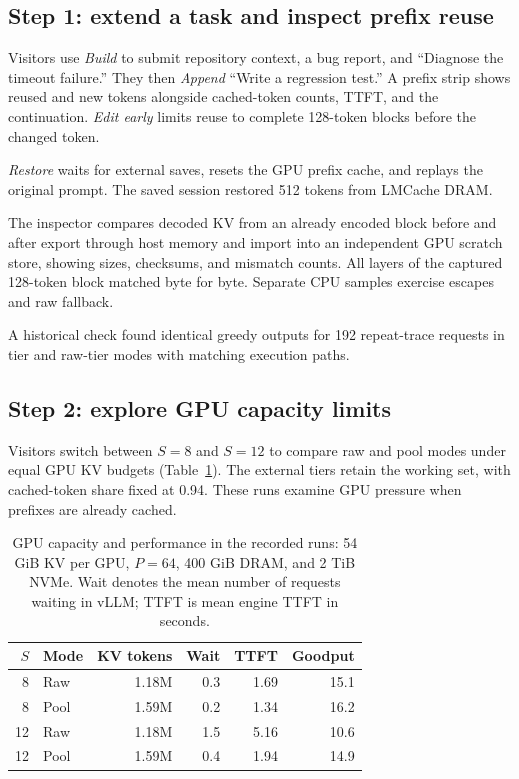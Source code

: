 \documentclass[conference]{IEEEtran}
\begin{document}
\subsection{Step 1: extend a task and inspect prefix reuse}
Visitors use \emph{Build} to submit repository context, a bug report,
and ``Diagnose the timeout failure.'' They then \emph{Append} ``Write a
regression test.'' A prefix strip shows reused and new tokens alongside cached-token
counts, TTFT, and the continuation. \emph{Edit early} limits reuse to complete
128-token blocks before the changed token.

\emph{Restore} waits for external saves, resets the GPU prefix cache, and
replays the original prompt. The saved session restored 512 tokens from
LMCache DRAM.

The inspector compares decoded KV from an already encoded block before
and after export through host memory and import into an independent GPU
scratch store, showing sizes, checksums, and mismatch counts. All layers
of the captured 128-token block matched byte for byte. Separate CPU samples
exercise escapes and raw fallback.

A historical check found identical greedy outputs for 192 repeat-trace
requests in tier and raw-tier modes with matching execution paths.

\subsection{Step 2: explore GPU capacity limits}
Visitors switch between $S=8$ and $S=12$ to compare raw and pool modes
under equal GPU KV budgets (Table~\ref{tab:gpu}). The external tiers retain
the working set, with cached-token share fixed at 0.94. These runs examine
GPU pressure when prefixes are already cached.

\begin{table}[t]
\centering
\caption{GPU capacity and performance in the recorded runs: 54 GiB KV per
GPU, $P=64$, 400 GiB DRAM, and 2 TiB NVMe. Wait denotes the mean number of
requests waiting in vLLM; TTFT is mean engine TTFT in seconds.}
\label{tab:gpu}
\small
\setlength{\tabcolsep}{3pt}
\begin{tabular*}{\columnwidth}{@{\extracolsep{\fill}}rlrrrr@{}}
\toprule
$S$ & Mode & KV tokens & Wait & TTFT & Goodput \\
\midrule
8  & Raw  & 1.18M & 0.3 & 1.69 & 15.1 \\
8  & Pool & 1.59M & 0.2 & 1.34 & 16.2 \\
12 & Raw  & 1.18M & 1.5 & 5.16 & 10.6 \\
12 & Pool & 1.59M & 0.4 & 1.94 & 14.9 \\
\bottomrule
\end{tabular*}
\end{table}
\end{document}
